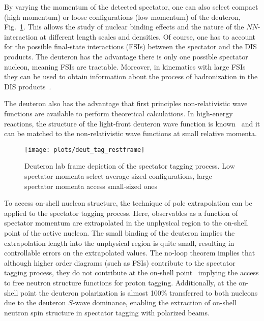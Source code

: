 By varying the momentum of the detected spectator, one can also select compact (high momentum) or loose configurations (low momentum) of the deuteron, Fig.~\ref{fig:size}.  This allows the study of nuclear binding effects and the nature of the $NN$-interaction at different length scales and densities.  Of course, one has to account for the possible final-state interactions (FSIs) between the spectator and the DIS products.  The deuteron has the advantage there is only one possible spectator nucleon, meaning FSIs are tractable.  Moreover, in kinematics with large FSIs they can be used to obtain information about the process of hadronization in the DIS products~\cite{Cosyn:2017ekf}.  

The deuteron also has the advantage that first principles non-relativistic wave functions are available to perform theoretical calculations.  In high-energy reactions, the structure of the light-front deuteron wave function is known~\cite{Frankfurt:1981mk,Keister:1991sb} and it can be matched to the non-relativistic wave functions at small relative momenta.

\begin{figure}[tbp]
\centering\texttt{[image: plots/deut\_tag\_restframe]}
\caption{Deuteron lab frame depiction of the spectator tagging process.  Low spectator momenta select average-sized configurations, large spectator momenta access small-sized ones~\cite{deutLDRD}}
\label{fig:size}
\end{figure}

To access on-shell nucleon structure, the technique of pole extrapolation can be applied to the spectator tagging process.  Here, observables as a function of spectator momentum are extrapolated in the unphysical region to the on-shell point of the active nucleon.  The small binding of the deuteron implies the extrapolation length into the unphysical region is quite small, resulting in controllable errors on the extrapolated values.  The no-loop theorem implies that although higher order diagrams (such as FSIs) contribute to the spectator tagging process, they do not contribute at the on-shell point~\cite{Sargsian:2005rm} implying the access to free neutron structure functions for proton tagging.  Additionally, at the on-shell point the deuteron polarization is almost 100\% transferred to both nucleons due to the deuteron $S$-wave dominance, enabling the extraction of on-shell neutron spin structure in spectator tagging with polarized beams.  

